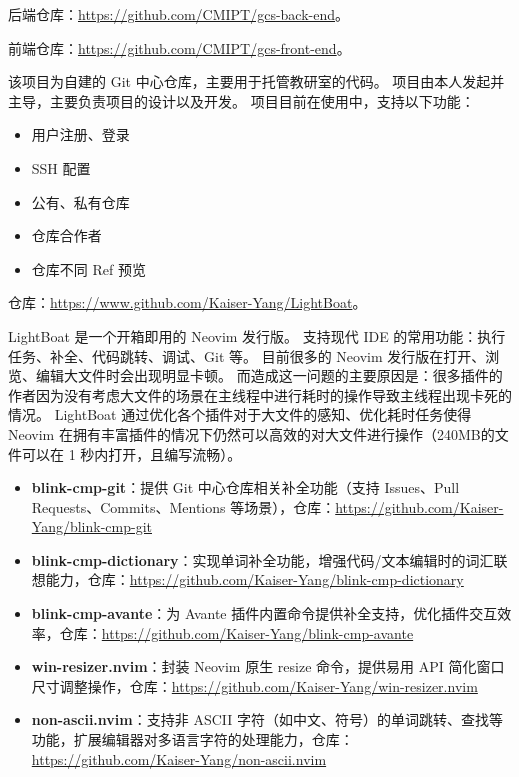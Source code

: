 \documentclass{resume}
\begin{document}
\begin{onehalfspacing}
后端仓库：\url{https://github.com/CMIPT/gcs-back-end}。

前端仓库：\url{https://github.com/CMIPT/gcs-front-end}。

该项目为自建的 Git 中心仓库，主要用于托管教研室的代码。
项目由本人发起并主导，主要负责项目的设计以及开发。
项目目前在使用中，支持以下功能：
\begin{itemize}
  \item 用户注册、登录
  \item SSH 配置
  \item 公有、私有仓库
  \item 仓库合作者
  \item 仓库不同 Ref 预览
\end{itemize}
\end{onehalfspacing}

\begin{onehalfspacing}
仓库：\url{https://www.github.com/Kaiser-Yang/LightBoat}。

LightBoat 是一个开箱即用的 Neovim 发行版。
支持现代 IDE 的常用功能：执行任务、补全、代码跳转、调试、Git 等。
目前很多的 Neovim 发行版在打开、浏览、编辑大文件时会出现明显卡顿。
而造成这一问题的主要原因是：很多插件的作者因为没有考虑大文件的场景在主线程中进行耗时的操作导致主线程出现卡死的情况。
LightBoat 通过优化各个插件对于大文件的感知、优化耗时任务使得 Neovim 在拥有丰富插件的情况下仍然可以高效的对大文件进行操作（240MB的文件可以在 1 秒内打开，且编写流畅）。
\end{onehalfspacing}

\begin{onehalfspacing}
\begin{itemize}[leftmargin=*]
  \item \textbf{blink-cmp-git}：提供 Git 中心仓库相关补全功能（支持 Issues、Pull Requests、Commits、Mentions 等场景），仓库：\url{https://github.com/Kaiser-Yang/blink-cmp-git}
  \item \textbf{blink-cmp-dictionary}：实现单词补全功能，增强代码/文本编辑时的词汇联想能力，仓库：\url{https://github.com/Kaiser-Yang/blink-cmp-dictionary}
  \item \textbf{blink-cmp-avante}：为 Avante 插件内置命令提供补全支持，优化插件交互效率，仓库：\url{https://github.com/Kaiser-Yang/blink-cmp-avante}
  \item \textbf{win-resizer.nvim}：封装 Neovim 原生 resize 命令，提供易用 API 简化窗口尺寸调整操作，仓库：\url{https://github.com/Kaiser-Yang/win-resizer.nvim}
  \item \textbf{non-ascii.nvim}：支持非 ASCII 字符（如中文、符号）的单词跳转、查找等功能，扩展编辑器对多语言字符的处理能力，仓库：\url{https://github.com/Kaiser-Yang/non-ascii.nvim}
\end{itemize}
\end{onehalfspacing}
\end{document}
